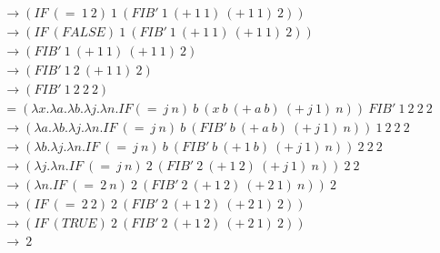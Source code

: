 \documentclass{article}
\begin{document}
\begin{enumerate}
\begin{align*}
\\&\rightarrow(IF\ (=\ 1\ 2)\ 1\ (FIB'\ 1\ (+\ 1\ 1)\ (+\ 1\ 1)\ 2))
\\&\rightarrow(IF\ (FALSE)\ 1\ (FIB'\ 1\ (+\ 1\ 1)\ (+\ 1\ 1)\ 2))
\\&\rightarrow (FIB'\ 1\ (+\ 1\ 1)\ (+\ 1\ 1)\ 2)
\\&\rightarrow (FIB'\ 1\ 2\ (+\ 1\ 1)\ 2)
\\&\rightarrow (FIB'\ 1\ 2\ 2\ 2)
\\&=(\lambda x . \lambda a . \lambda b . \lambda j . \lambda n . IF (=\ j\ n)\ b\ (x\ b\ (+\ a\ b)\ (+\ j\ 1)\ n))\ FIB'\ 1\ 2\ 2\ 2
\\&\rightarrow(\lambda a . \lambda b . \lambda j . \lambda n . IF\ (=\ j\ n)\ b\ (FIB'\ b\ (+\ a\ b)\ (+\ j\ 1)\ n))\ 1\ 2\ 2\ 2
\\&\rightarrow(\lambda b . \lambda j . \lambda n . IF\ (=\ j\ n)\ b\ (FIB'\ b\ (+\ 1\ b)\ (+\ j\ 1)\ n))\ 2\ 2\ 2
\\&\rightarrow(\lambda j . \lambda n . IF\ (=\ j\ n)\ 2\ (FIB'\ 2\ (+\ 1\ 2)\ (+\ j\ 1)\ n))\ 2\ 2
\\&\rightarrow(\lambda n . IF\ (=\ 2\ n)\ 2\ (FIB'\ 2\ (+\ 1\ 2)\ (+\ 2\ 1)\ n))\ 2
\\&\rightarrow(IF\ (=\ 2\ 2)\ 2\ (FIB'\ 2\ (+\ 1\ 2)\ (+\ 2\ 1)\ 2))
\\&\rightarrow(IF\ (TRUE)\ 2\ (FIB'\ 2\ (+\ 1\ 2)\ (+\ 2\ 1)\ 2))
\\&\rightarrow\ 2
\end{align*}

\end{enumerate}
\end{document}
